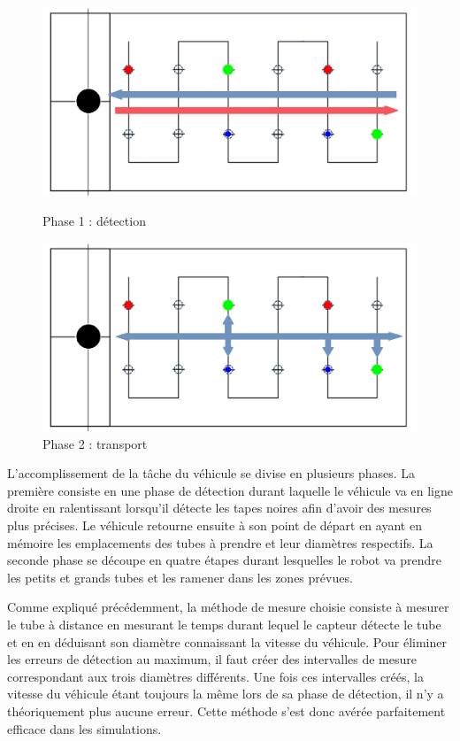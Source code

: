 \documentclass[a4paper,11pt]{article}
\begin{document}
 \begin{figure}[H]
    \begin{minipage}[c]{.46\linewidth}
        \centering
        \includegraphics[scale = 0.15]{simu_veh.png}
        \caption{Phase 1 : détection}
    \end{minipage}
    \hfill
    \begin{minipage}[c]{.46\linewidth}
        \centering
        \includegraphics[scale = 0.15]{simu_veh2.png}
        \caption{Phase 2 : transport}
    \end{minipage}
 \end{figure}
 
L'accomplissement de la tâche du véhicule se divise en plusieurs phases. La première consiste en une phase de détection durant laquelle le véhicule va en ligne droite en ralentissant lorsqu'il détecte les tapes noires afin d'avoir des mesures plus précises. Le véhicule retourne ensuite à son point de départ en ayant en mémoire les emplacements des tubes à prendre et leur diamètres respectifs. La seconde phase se découpe en quatre étapes durant lesquelles le robot va prendre les petits et grands tubes et les ramener dans les zones prévues.
 
Comme expliqué précédemment, la méthode de mesure choisie consiste à mesurer le tube à distance en mesurant le temps durant lequel le capteur détecte le tube et en en déduisant son diamètre connaissant la vitesse du véhicule. Pour éliminer les erreurs de détection au maximum, il faut créer des intervalles de mesure correspondant aux trois diamètres différents. Une fois ces intervalles créés, la vitesse du véhicule étant toujours la même lors de sa phase de détection, il n'y a théoriquement plus aucune erreur. Cette méthode s'est donc avérée parfaitement efficace dans les simulations. 
 
\end{document}
